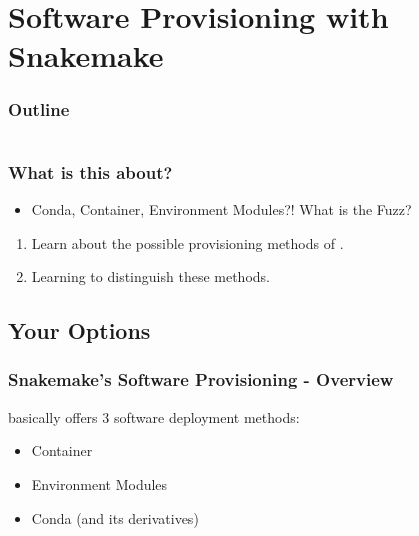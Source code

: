 \section{Software Provisioning with Snakemake}

\begin{frame}
	\frametitle{Outline}
	\begin{columns}[t]
		\begin{column}{.5\textwidth}
            \tableofcontents[sections={1-7},currentsection]
		\end{column}
		\begin{column}{.5\textwidth}
            \tableofcontents[sections={8-15},currentsection]
		\end{column}
	\end{columns}
\end{frame}

\begin{frame}
	\frametitle{What is this about?}
	\begin{question}[Questions]
		\begin{itemize}
			\item Conda, Container, Environment Modules?! What is the Fuzz?
		\end{itemize}
	\end{question}
	\begin{docs}[Objectives]
		\begin{enumerate}
			\item Learn about the possible provisioning methods of \Snakemake.
			\item Learning to distinguish these methods.
		\end{enumerate}
	\end{docs}
\end{frame}

\subsection{Your Options}

\begin{frame}
  \frametitle{Snakemake's Software Provisioning - Overview}
  \Snakemake{} basically offers 3 software deployment methods:
  \begin{itemize}[<+->]
    \item Container
    \item Environment Modules
    \item Conda (and its derivatives)
  \end{itemize}
\end{frame}

